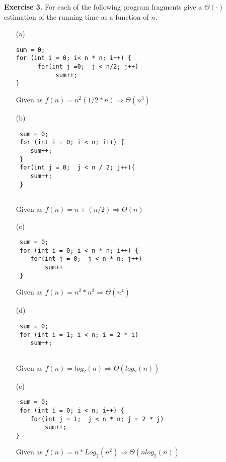 \documentclass[12pt,letterpaper,final]{report}
\begin{document}
\textbf{Exercise 3.}
For each of the following program fragments give a $\Theta(\cdot)$  estimation of the running time as a function of $n$.
\begin{enumerate}
\item[(a)]
\begin{verbatim}
sum = 0;
for (int i = 0; i< n * n; i++) {
      for(int j =0;  j < n/2; j++)
    	   sum++;
}

\end{verbatim}
Given as $f(n) = n^2(1/2*n) \Rightarrow \Theta(n^3)$

\item[(b)]
\begin{verbatim}
 sum = 0;
 for (int i = 0; i < n; i++) {
    sum++;
 }
 for(int j = 0;  j < n / 2; j++){
    sum++;
 }
 
\end{verbatim}
Given as $f(n) = n+(n/2) \Rightarrow \Theta(n)$

\item[(c)]
\begin{verbatim}
 sum = 0;
 for (int i = 0; i < n * n; i++) {
    for(int j = 0;  j < n * n; j++)
        sum++
 }

\end{verbatim}
Given as $f(n) = n^2*n^2 \Rightarrow \Theta(n^4) $
\pagebreak

\item[(d)]
\begin{verbatim}
 sum = 0;
 for (int i = 1; i < n; i = 2 * i)
    sum++;
    
\end{verbatim}
Given as $f(n) = log_2(n)   \Rightarrow \Theta(log_2(n)) $

\item[(e)]
\begin{verbatim}
 sum = 0;
 for (int i = 0; i < n; i++) {
    for(int j = 1;  j < n * n; j = 2 * j)
        sum++;
}

\end{verbatim}
Given as $f(n) = n*Log_2(n^2) \Rightarrow \Theta(nlog_2(n))$

\end{enumerate}
\bigskip
\end{document}
